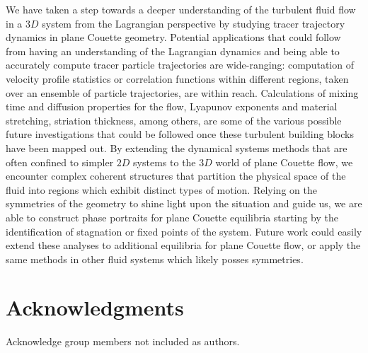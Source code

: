 \documentclass[letter,12pt,openany]{article}
\begin{document}
We have taken a step towards a deeper understanding of the  turbulent fluid flow in a $3D$ system from the Lagrangian perspective by studying tracer trajectory dynamics in plane Couette geometry.
Potential applications that could follow from having an understanding of the Lagrangian dynamics and being able to accurately compute tracer particle trajectories are wide-ranging: computation of velocity profile statistics or correlation functions within different regions, taken over an ensemble of particle trajectories, are within reach. Calculations of mixing time
and diffusion properties for the flow, Lyapunov exponents and material stretching,
striation thickness, among others, are some of the various possible future investigations that could be followed once these turbulent building blocks have been mapped out. By extending the dynamical systems methods that are often confined to simpler $2D$ systems to the $3D$ world of plane Couette flow, we encounter complex coherent structures that partition the physical space of the fluid into regions which exhibit distinct types of motion. Relying on the symmetries of the geometry to shine light upon the situation and guide us, we are able to construct phase portraits for plane Couette equilibria starting by the identification of stagnation or fixed points of the system. Future work could easily extend these analyses to additional equilibria for plane Couette flow, or apply the same methods in other fluid systems which likely posses symmetries.


\section{\centering Acknowledgments}
Acknowledge group members not included as authors.










\end{document}
